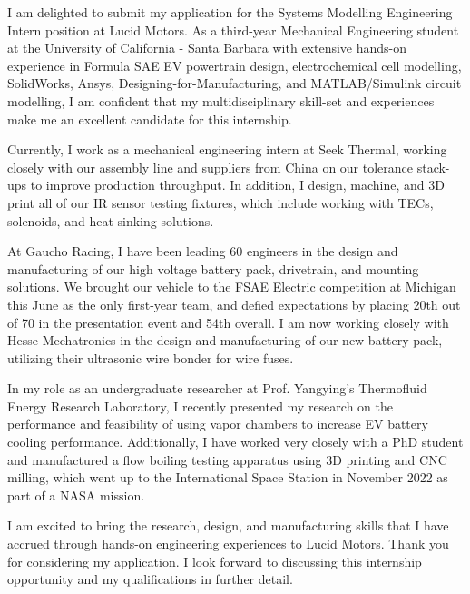 \documentclass[11pt, letterpaper]{awesome-cv} %
\begin{document}
\makecvheader %

\makelettertitle %


\begin{cvletter}


I am delighted to submit my application for the Systems Modelling Engineering Intern position at Lucid Motors. As a third-year Mechanical Engineering student at the University of California - Santa Barbara with extensive hands-on experience in Formula SAE EV powertrain design, electrochemical cell modelling, SolidWorks, Ansys, Designing-for-Manufacturing, and MATLAB/Simulink circuit modelling, I am confident that my multidisciplinary skill-set and experiences make me an excellent candidate for this internship.

Currently, I work as a mechanical engineering intern at Seek Thermal, working closely with our assembly line and suppliers from China on our tolerance stack-ups to improve production throughput. In addition, I design, machine, and 3D print all of our IR sensor testing fixtures, which include working with TECs, solenoids, and heat sinking solutions.

At Gaucho Racing, I have been leading 60 engineers in the design and manufacturing of our high voltage battery pack, drivetrain, and mounting solutions. We brought our vehicle to the FSAE Electric competition at Michigan this June as the only first-year team, and defied expectations by placing 20th out of 70 in the presentation event and 54th overall. I am now working closely with Hesse Mechatronics in the design and manufacturing of our new battery pack, utilizing their ultrasonic wire bonder for wire fuses. 

In my role as an undergraduate researcher at Prof. Yangying's Thermofluid Energy Research Laboratory, I recently presented my research on the performance and feasibility of using vapor chambers to increase EV battery cooling performance. Additionally, I have worked very closely with a PhD student and manufactured a flow boiling testing apparatus using 3D printing and CNC milling, which went up to the International Space Station in November 2022 as part of a NASA mission. 

I am excited to bring the research, design, and manufacturing skills that I have accrued through hands-on engineering experiences to Lucid Motors. Thank you for considering my application. I look forward to discussing this internship opportunity and my qualifications in further detail.


\end{cvletter}


\makeletterclosing %
\end{document}
